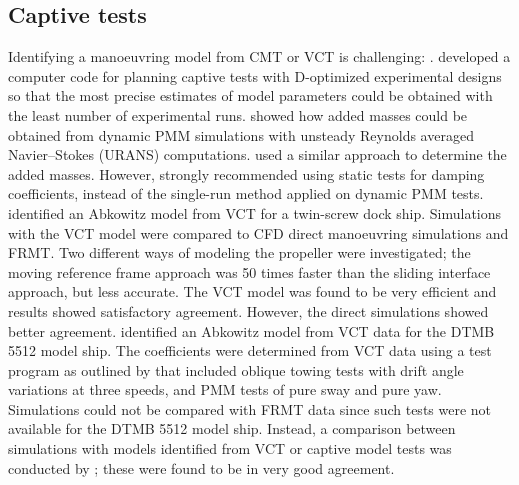 \subsection{Captive tests} \label{sec:CT}
Identifying a manoeuvring model from CMT or VCT is challenging:  \cite{sutuloAlgorithmOfflineIdentification2014}.
\textcite{sutuloSynthesisExperimentalDesigns2004} developed a computer code for planning captive tests with D-optimized experimental designs so that the most precise estimates of model parameters could be obtained with the least number of experimental runs.
\textcite{sakamotoURANSSimulationsStatic2012} showed how added masses could be obtained from dynamic PMM simulations with unsteady Reynolds averaged Navier–Stokes (URANS) computations. \textcite{elmoctarRANSBasedSimulatedShip2014} used a similar approach to determine the added masses. 
However, \textcite{sakamotoURANSSimulationsStatic2012} strongly recommended using static tests for damping coefficients, instead of the single-run method applied on dynamic PMM tests.
\textcite{elmoctarRANSBasedSimulatedShip2014} identified an Abkowitz model from VCT for a twin-screw dock ship. Simulations with the VCT model were compared to CFD direct manoeuvring simulations and FRMT. Two different ways of modeling the propeller were investigated; the moving reference frame approach was 50 times faster than the sliding interface approach, but less accurate. The VCT model was found to be very efficient and results showed satisfactory agreement. However, the direct simulations showed better agreement.
\textcite{hajivandVirtualSimulationManeuvering2015} identified an Abkowitz model from VCT data for the DTMB 5512 model ship. The coefficients were determined from VCT data using a test program as outlined by \textcite{yoonBenchmarkCFDValidation2015c} that included oblique towing tests with drift angle variations at three speeds, and PMM tests of pure sway and pure yaw.
Simulations could not be compared with FRMT data since such tests were not available for the DTMB 5512 model ship. 
Instead, a comparison between simulations with models identified from VCT or captive model tests was conducted by \textcite{yoonBenchmarkCFDValidation2015c}; these were found to be in very good agreement.

